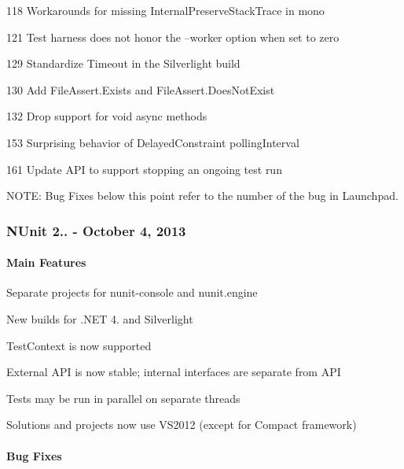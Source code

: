 \begin{DoxyItemize}
\item 118 Workarounds for missing Internal\+Preserve\+Stack\+Trace in mono
\item 121 Test harness does not honor the --worker option when set to zero
\item 129 Standardize Timeout in the Silverlight build
\item 130 Add File\+Assert.\+Exists and File\+Assert.\+Does\+Not\+Exist
\item 132 Drop support for void async methods
\item 153 Surprising behavior of Delayed\+Constraint polling\+Interval
\item 161 Update A\+PI to support stopping an ongoing test run
\end{DoxyItemize}

N\+O\+TE\+: Bug Fixes below this point refer to the number of the bug in Launchpad.

\subsubsection*{N\+Unit 2.. -\/ October 4, 2013}

\paragraph*{Main Features}


\begin{DoxyItemize}
\item Separate projects for nunit-\/console and nunit.\+engine
\item New builds for .N\+ET 4. and Silverlight
\item Test\+Context is now supported
\item External A\+PI is now stable; internal interfaces are separate from A\+PI
\item Tests may be run in parallel on separate threads
\item Solutions and projects now use V\+S2012 (except for Compact framework)
\end{DoxyItemize}

\paragraph*{Bug Fixes}


